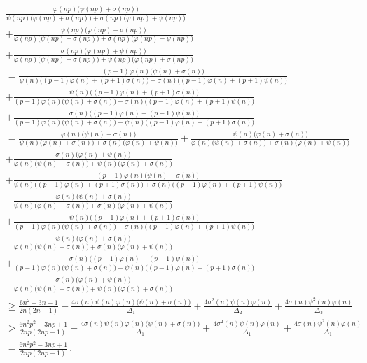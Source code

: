 \documentclass[12pt]{article}
\begin{document}
\begin{align*}
&\frac{\varphi(np)\big(\psi(np)+\sigma(np)\big)}{\psi(np)\big(\varphi(np)+\sigma(np)\big)+\sigma(np)\big(\varphi(np)+\psi(np)\big)}\\
&+\frac{\psi(np)\big(\varphi(np)+\sigma(np)\big)}{\varphi(np)\big(\psi(np)+\sigma(np)\big)+\sigma(np)\big(\varphi(np)+\psi(np)\big)}\\
&+\frac{\sigma(np)\big(\varphi(np)+\psi(np)\big)}{\varphi(np)\big(\psi(np)+\sigma(np)\big)+\psi(np)\big(\varphi(np)+\sigma(np)\big)}\\
&=\frac{(p-1)\varphi(n)\big(\psi(n)+\sigma(n)\big)}{\psi(n)\big((p-1)\varphi(n)+(p+1)\sigma(n)\big)+\sigma(n)\big((p-1)\varphi(n)+(p+1)\psi(n)\big)}\\
&+\frac{\psi(n)\big((p-1)\varphi(n)+(p+1)\sigma(n)\big)}{(p-1)\varphi(n)\big(\psi(n)+\sigma(n)\big)+\sigma(n)\big((p-1)\varphi(n)+(p+1)\psi(n)\big)}\\
&+\frac{\sigma(n)\big((p-1)\varphi(n)+(p+1)\psi(n)\big)}{(p-1)\varphi(n)\big(\psi(n)+\sigma(n)\big)+\psi(n)\big((p-1)\varphi(n)+(p+1)\sigma(n)\big)}\\
&=\frac{\varphi(n)\big(\psi(n)+\sigma(n)\big)}{\psi(n)\big(\varphi(n)+\sigma(n)\big)+\sigma(n)\big(\varphi(n)+\psi(n)\big)}
+\frac{\psi(n)\big(\varphi(n)+\sigma(n)\big)}{\varphi(n)\big(\psi(n)+\sigma(n)\big)+\sigma(n)\big(\varphi(n)+\psi(n)\big)}\\
&+\frac{\sigma(n)\big(\varphi(n)+\psi(n)\big)}{\varphi(n)\big(\psi(n)+\sigma(n)\big)+\psi(n)\big(\varphi(n)+\sigma(n)\big)}\\
&+\frac{(p-1)\varphi(n)\big(\psi(n)+\sigma(n)\big)}{\psi(n)\big((p-1)\varphi(n)+(p+1)\sigma(n)\big)+\sigma(n)\big((p-1)\varphi(n)+(p+1)\psi(n)\big)}\\
&-\frac{\varphi(n)\big(\psi(n)+\sigma(n)\big)}{\psi(n)\big(\varphi(n)+\sigma(n)\big)+\sigma(n)\big(\varphi(n)+\psi(n)\big)}\\
&+\frac{\psi(n)\big((p-1)\varphi(n)+(p+1)\sigma(n)\big)}{(p-1)\varphi(n)\big(\psi(n)+\sigma(n)\big)+\sigma(n)\big((p-1)\varphi(n)+(p+1)\psi(n)\big)}\\
&-\frac{\psi(n)\big(\varphi(n)+\sigma(n)\big)}{\varphi(n)\big(\psi(n)+\sigma(n)\big)+\sigma(n)\big(\varphi(n)+\psi(n)\big)}\\
&+\frac{\sigma(n)\big((p-1)\varphi(n)+(p+1)\psi(n)\big)}{(p-1)\varphi(n)\big(\psi(n)+\sigma(n)\big)+\psi(n)\big((p-1)\varphi(n)+(p+1)\sigma(n)\big)}\\
&-\frac{\sigma(n)\big(\varphi(n)+\psi(n)\big)}{\varphi(n)\big(\psi(n)+\sigma(n)\big)+\psi(n)\big(\varphi(n)+\sigma(n)\big)}\\
&\geq\frac{6n^2-3n+1}{2n(2n-1)}-\frac{4\sigma(n)\psi(n)\varphi(n)\big(\psi(n)+\sigma(n)\big)}{\Delta_1}+\frac{4\sigma^2(n)\psi(n)\varphi(n)}{\Delta_2}+\frac{4\sigma(n)\psi^2(n)\varphi(n)}{\Delta_3}\\
&>\frac{6n^2p^2-3np+1}{2np(2np-1)}-\frac{4\sigma(n)\psi(n)\varphi(n)\big(\psi(n)+\sigma(n)\big)}{\Delta_1}+\frac{4\sigma^2(n)\psi(n)\varphi(n)}{\Delta_1}+\frac{4\sigma(n)\psi^2(n)\varphi(n)}{\Delta_1}\\
&=\frac{6n^2p^2-3np+1}{2np(2np-1)}\,.
\end{align*}
\end{document}
